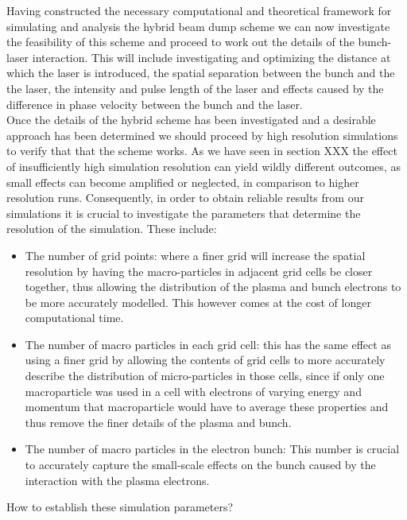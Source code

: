 \begin{itemize}
\newpage


Having constructed the necessary computational and theoretical framework for simulating and analysis the hybrid beam dump scheme we can now investigate the feasibility of this scheme and proceed to work out the details of the bunch-laser interaction. This will include investigating and optimizing the distance at which   the laser is introduced, the spatial separation between the bunch and the the laser, the intensity and pulse length of the laser and effects caused by the difference in phase velocity between the bunch and the laser.\\
Once the details of the hybrid scheme has been investigated and a desirable approach has been determined we should proceed by high resolution simulations to verify that that the scheme works. As we have seen in section XXX the effect of insufficiently high simulation resolution can yield wildly different outcomes, as small effects can become amplified or neglected, in comparison to higher resolution runs. Consequently, in order to obtain reliable results from our simulations it is crucial to investigate the parameters that determine the resolution of the simulation. These include:
\begin{itemize}
\item The number of grid points: where a finer grid will increase the spatial resolution by having the macro-particles in adjacent grid cells be closer together, thus allowing the distribution of the plasma and bunch electrons to be more accurately modelled. This however comes at the cost of longer computational time.
\item The number of macro particles in each grid cell: this has the same effect as using a finer grid by allowing the contents of grid cells to more accurately describe the distribution of micro-particles in those cells, since if only one macroparticle was used in a cell with electrons of varying energy and momentum that macroparticle would have to average these properties and thus remove the finer details of the plasma and bunch.
\item The number of macro particles in the electron bunch: This number is crucial to accurately capture the small-scale effects on the bunch caused by the interaction with the plasma electrons. 
\end{itemize}
How to establish these simulation parameters?\\


\end{itemize}
